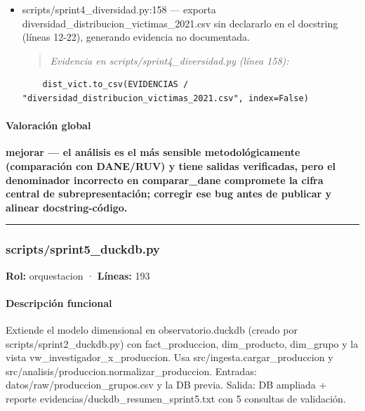 \begin{tcolorbox}[riesgo]
\begin{itemize}
  \item scripts/sprint4\_diversidad.py:158 --- exporta diversidad\_distribucion\_victimas\_2021.csv sin declararlo en el docstring (líneas 12-22), generando evidencia no documentada.
\begin{quote}\footnotesize\ttfamily
\noindent\emph{Evidencia en scripts/sprint4\_diversidad.py (línea 158):}
\end{quote}
\begin{lstlisting}
    dist_vict.to_csv(EVIDENCIAS / "diversidad_distribucion_victimas_2021.csv", index=False)
\end{lstlisting}

\end{itemize}
\end{tcolorbox}

\paragraph{Valoración global}
\textbf{mejorar --- el análisis es el más sensible metodológicamente (comparación con DANE/RUV) y tiene salidas verificadas, pero el denominador incorrecto en comparar\_dane compromete la cifra central de subrepresentación; corregir ese bug antes de publicar y alinear docstring-código.}

\medskip
\hrule

\subsubsection{scripts/sprint5\_duckdb.py}
\textbf{Rol:} orquestacion · \textbf{Líneas:} 193

\paragraph{Descripción funcional}
Extiende el modelo dimensional en observatorio.duckdb (creado por scripts/sprint2\_duckdb.py) con fact\_produccion, dim\_producto, dim\_grupo y la vista vw\_investigador\_x\_produccion. Usa src/ingesta.cargar\_produccion y src/analisis/produccion.normalizar\_produccion. Entradas: datos/raw/produccion\_grupos.csv y la DB previa. Salida: DB ampliada + reporte evidencias/duckdb\_resumen\_sprint5.txt con 5 consultas de validación.

